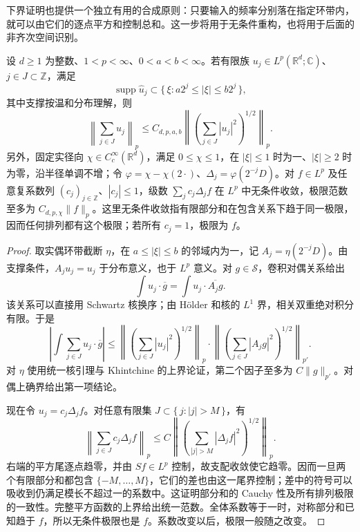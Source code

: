 下界证明也提供一个独立有用的合成原则：只要输入的频率分别落在指定环带内，就可以由它们的逐点平方和控制总和。这一步将用于无条件重构，也将用于后面的非齐次空间识别。

\begin{proposition}[环带合成与无条件重构]\label{b2:prop:19-square-synthesis}
设 \(d\geq1\) 为整数、\(1<p<\infty\)、\(0<a<b<\infty\)。若有限族 \(u_j\in L^p(\mathbb R^d;\mathbb C)\)、\(j\in J\subset\mathbb Z\)，满足
\[
 \operatorname{supp}\widehat u_j
 \subset\{\,\xi:a2^j\leq|\xi|\leq b2^j\,\},
\]
其中支撑按温和分布理解，则
\[
 \left\|\sum_{j\in J}u_j\right\|_p
 \leq C_{d,p,a,b}
       \left\|\left(\sum_{j\in J}|u_j|^2\right)^{1/2}\right\|_p.
\]
另外，固定实径向 \(\chi\in C_c^\infty(\mathbb R^d)\)，满足 \(0\leq\chi\leq1\)，在 \(|\xi|\leq1\) 时为一、\(|\xi|\geq2\) 时为零，沿半径单调不增；令 \(\varphi=\chi-\chi(2\cdot)\)、\(\Delta_j=\varphi(2^{-j}D)\)。对 \(f\in L^p\) 及任意复系数列 \((c_j)_{j\in\mathbb Z}\)、\(|c_j|\leq1\)，级数 \(\sum_jc_j\Delta_jf\) 在 \(L^p\) 中无条件收敛，极限范数至多为 \(C_{d,p,\chi}\|f\|_p\)。这里无条件收敛指有限部分和在包含关系下趋于同一极限，因而任何排列都有这个极限；若所有 \(c_j=1\)，极限为 \(f\)。
\end{proposition}
\begin{proof}
取实偶环带截断 \(\eta\)，在 \(a\leq|\xi|\leq b\) 的邻域内为一，记 \(A_j=\eta(2^{-j}D)\)。由支撑条件，\(A_ju_j=u_j\) 于分布意义，也于 \(L^p\) 意义。对 \(g\in\mathcal S\)，卷积对偶关系给出
\[
 \int u_j\cdot\overline g
 =\int u_j\cdot\overline{A_jg}.
\]
该关系可以直接用 Schwartz 核换序；由 Hölder 和核的 \(L^1\) 界，相关双重绝对积分有限。于是
\[
 \left|\int\sum_{j\in J}u_j\cdot\overline g\right|
 \leq
 \left\|\left(\sum_{j\in J}|u_j|^2\right)^{1/2}\right\|_p
 \cdot\left\|\left(\sum_{j\in J}|A_jg|^2\right)^{1/2}\right\|_{p'}.
\]
对 \(\eta\) 使用统一核引理与 Khintchine 的上界论证，第二个因子至多为 \(C\|g\|_{p'}\)。对偶上确界给出第一项结论。

现在令 \(u_j=c_j\Delta_jf\)。对任意有限集 \(J\subset\{\,j:|j|>M\,\}\)，有
\[
 \left\|\sum_{j\in J}c_j\Delta_jf\right\|_p
 \leq C\left\|\left(\sum_{|j|>M}|\Delta_jf|^2\right)^{1/2}\right\|_p.
\]
右端的平方尾逐点趋零，并由 \(Sf\in L^p\) 控制，故支配收敛使它趋零。因而一旦两个有限部分和都包含 \(\{-M,\ldots,M\}\)，它们的差也由这一尾界控制；差中的符号可以吸收到仍满足模长不超过一的系数中。这证明部分和的 Cauchy 性及所有排列极限的一致性。完整平方函数的上界给出统一范数。全体系数等于一时，对称部分和已知趋于 \(f\)，所以无条件极限也是 \(f\)。系数改变以后，极限一般随之改变。
\end{proof}

